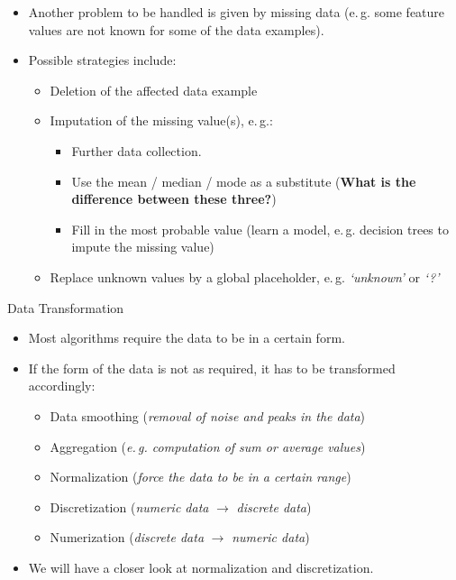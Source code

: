 \begin{frame}
	\begin{itemize}
		\item Another problem to be handled is given by missing data (e.\,g. some feature values are not known for some of the data examples).
		\item Possible strategies include:
		\begin{itemize}
			\item Deletion of the affected data example
			\item Imputation of the missing value(s), e.\,g.:
			\begin{itemize}
				\item Further data collection.
				\item Use the mean / median / mode as a substitute (\textbf{What is the difference between these three?})
				\item Fill in the most probable value (learn a model, e.\,g. decision trees to impute the missing value)
			\end{itemize}
			\item Replace unknown values by a global placeholder, e.\,g. \textit{`unknown'} or \textit{`?'}
		\end{itemize}
	\end{itemize}
\end{frame}


\begin{dwHeaderFrame}{Data Transformation}
	\begin{itemize}
		\item Most algorithms require the data to be in a certain form.
		\item If the form of the data is not as required, it has to be transformed accordingly:
		\begin{itemize}
			\item Data smoothing (\textit{removal of noise and peaks in the data})
			\item Aggregation (\textit{e.\,g. computation of sum or average values})
			\item Normalization (\textit{force the data to be in a certain range})
			\item Discretization (\textit{numeric data} $\rightarrow$ \textit{discrete data})
			\item Numerization (\textit{discrete data} $\rightarrow$ \textit{numeric data})
		\end{itemize}
		\item We will have a closer look at normalization and discretization.
	\end{itemize}
\end{dwHeaderFrame}


